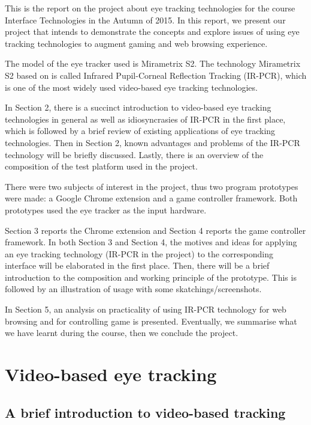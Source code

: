 \documentclass[english]{tktltiki}
\begin{document}
This is the report on the project about eye tracking technologies for the course Interface Technologies in the Autumn of 2015. In this report, we present our project that intends to demonstrate the concepts and explore issues of using eye tracking technologies to augment gaming and web browsing experience.  

The model of the eye tracker used is Mirametrix S2. The technology Mirametrix S2 based on is called Infrared Pupil-Corneal Reflection Tracking (IR-PCR), which is one of the most widely used video-based eye tracking technologies. 

In Section 2, there is a succinct introduction to video-based eye tracking technologies in general as well as idiosyncrasies of IR-PCR in the first place, which is followed by a brief review of existing applications of eye tracking technologies. Then in Section 2, known advantages and problems of the IR-PCR technology will be briefly discussed. Lastly, there is an overview of the composition of the test platform used in the project.

There were two subjects of interest in the project, thus two program prototypes were made: a Google Chrome extension and a game controller framework.  Both prototypes used the eye tracker as the input hardware.

Section 3 reports the Chrome extension and Section 4 reports the game controller framework. In both Section 3 and Section 4, the motives and ideas for applying an eye tracking technology (IR-PCR in the project) to the corresponding interface will be elaborated in the first place. Then, there will be a brief introduction to the composition and working principle of the prototype. This is followed by an illustration of usage with some skatchings/screenshots. 

In Section 5,  an analysis on practicality of using IR-PCR technology for web browsing and for controlling game is presented. Eventually, we summarise what we have learnt during the course, then we conclude the project.


\section{Video-based eye tracking}

\subsection{A brief introduction to video-based tracking}
\end{document}
